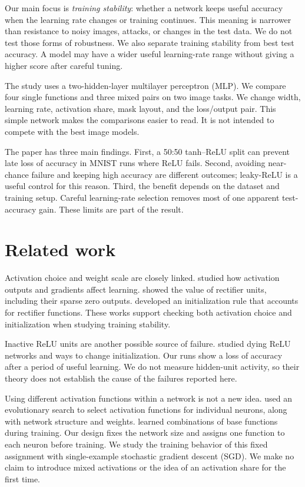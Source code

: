 \documentclass[10pt]{article}
\begin{document}
Our main focus is \emph{training stability}: whether a network keeps useful accuracy when the learning rate changes or training continues. This meaning is narrower than resistance to noisy images, attacks, or changes in the test data. We do not test those forms of robustness. We also separate training stability from best test accuracy. A model may have a wider useful learning-rate range without giving a higher score after careful tuning.

The study uses a two-hidden-layer multilayer perceptron (MLP). We compare four single functions and three mixed pairs on two image tasks. We change width, learning rate, activation share, mask layout, and the loss/output pair. This simple network makes the comparisons easier to read. It is not intended to compete with the best image models.

The paper has three main findings. First, a 50:50 tanh--ReLU split can prevent late loss of accuracy in MNIST runs where ReLU fails. Second, avoiding near-chance failure and keeping high accuracy are different outcomes; leaky-ReLU is a useful control for this reason. Third, the benefit depends on the dataset and training setup. Careful learning-rate selection removes most of one apparent test-accuracy gain. These limits are part of the result.

\section{Related work}
Activation choice and weight scale are closely linked. \citet{glorot2010} studied how activation outputs and gradients affect learning. \citet{glorot2011} showed the value of rectifier units, including their sparse zero outputs. \citet{he2015} developed an initialization rule that accounts for rectifier functions. These works support checking both activation choice and initialization when studying training stability.

Inactive ReLU units are another possible source of failure. \citet{lu2019} studied dying ReLU networks and ways to change initialization. Our runs show a loss of accuracy after a period of useful learning. We do not measure hidden-unit activity, so their theory does not establish the cause of the failures reported here.

Using different activation functions within a network is not a new idea. \citet{hagg2017} used an evolutionary search to select activation functions for individual neurons, along with network structure and weights. \citet{manessi2018} learned combinations of base functions during training. Our design fixes the network size and assigns one function to each neuron before training. We study the training behavior of this fixed assignment with single-example stochastic gradient descent (SGD). We make no claim to introduce mixed activations or the idea of an activation share for the first time.
\end{document}
